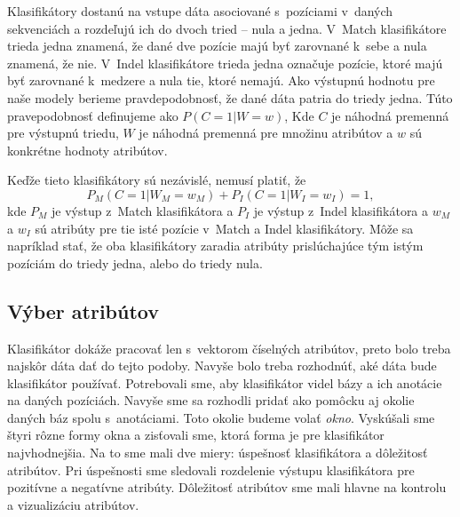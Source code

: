 Klasifikátory dostanú na vstupe dáta asociované s~pozíciami v~daných sekvenciách a rozdeľujú ich do dvoch tried -- nula a jedna. V~Match klasifikátore trieda jedna znamená, že dané dve pozície majú byť zarovnané k~sebe a nula znamená, že nie. V~Indel klasifikátore trieda jedna označuje pozície, ktoré majú byť zarovnané k~medzere a nula tie, ktoré nemajú. Ako výstupnú hodnotu pre naše modely berieme pravdepodobnosť, že dané dáta patria do triedy jedna. Túto pravepodobnosť definujeme ako $P(C=1|W=w)$, Kde $C$ je náhodná premenná pre výstupnú triedu, $W$ je náhodná premenná pre množinu atribútov a $w$ sú konkrétne hodnoty atribútov.

Keďže tieto klasifikátory sú nezávislé, nemusí platiť, že $$P_M(C=1|W_M=w_M) + P_I(C=1|W_I=w_I) = 1,$$ kde $P_M$ je výstup z~Match klasifikátora a $P_I$ je výstup z~Indel klasifikátora a $w_M$ a $w_I$ sú atribúty pre tie isté pozície v~Match a Indel klasifikátory. Môže sa napríklad stať, že oba klasifikátory zaradia atribúty prislúchajúce tým istým pozíciám do triedy jedna, alebo do triedy nula.

\subsection{Výber atribútov}
\label{subsec:attribute-selection}

Klasifikátor dokáže pracovať len s~vektorom číselných atribútov, preto bolo treba najskôr dáta dať do tejto podoby. Navyše bolo treba rozhodnúť, aké dáta bude klasifikátor používať. Potrebovali sme, aby klasifikátor videl bázy a ich anotácie na daných pozíciách. Navyše sme sa rozhodli pridať ako pomôcku aj okolie daných báz spolu s~anotáciami. Toto okolie budeme volať \textit{okno}. Vyskúšali sme štyri rôzne formy okna a zisťovali sme, ktorá forma je pre klasifikátor najvhodnejšia. Na to sme mali dve miery: úspešnosť klasifikátora a dôležitosť atribútov. Pri úspešnosti sme sledovali rozdelenie výstupu klasifikátora pre pozitívne a negatívne atribúty. Dôležitosť atribútov sme mali hlavne na kontrolu a vizualizáciu atribútov.

